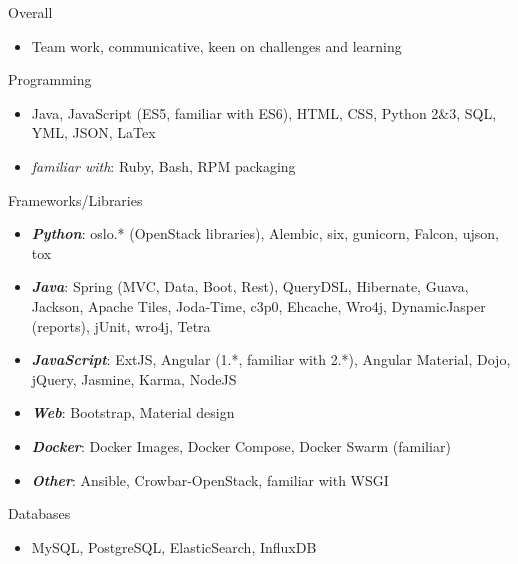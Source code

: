 
\begin{cvskills}

    \cvskill
    {Overall}
    {
      \begin{itemize}[label={}]
        \item Team work, communicative, keen on challenges and learning
      \end{itemize}
    }

    \cvskill
    {Programming}
    {
      \begin{itemize}[label={}]
        \item Java, JavaScript (ES5, familiar with ES6), HTML, CSS, Python 2\&3,
          SQL, YML, JSON, LaTex
        \item \textit{familiar with}: Ruby, Bash, RPM packaging
      \end{itemize}
    }

    \cvskill
    {Frameworks/Libraries}
    {
      \begin{itemize}[label={}]
        \item \textit{\textbf{Python}}: oslo.* (OpenStack libraries), Alembic, six,
          gunicorn, Falcon, ujson, tox
        \item \textit{\textbf{Java}}: Spring (MVC, Data, Boot, Rest), QueryDSL, Hibernate, Guava, \linebreak
          Jackson, Apache Tiles, Joda-Time, c3p0, Ehcache, Wro4j, \linebreak
          DynamicJasper (reports), jUnit, wro4j, Tetra
        \item \textit{\textbf{JavaScript}}: ExtJS, Angular (1.*, familiar with 2.*),
          Angular Material, Dojo, jQuery,\linebreak
          Jasmine, Karma, NodeJS
        \item \textit{\textbf{Web}}: Bootstrap, Material design
        \item \textit{\textbf{Docker}}: Docker Images, Docker Compose, Docker Swarm (familiar)
        \item \textit{\textbf{Other}}: Ansible, Crowbar-OpenStack, familiar with WSGI
      \end{itemize}
    }

    \cvskill
    {Databases}
    {
      \begin{itemize}[label={}]
        \item MySQL, PostgreSQL, ElasticSearch, InfluxDB
      \end{itemize}
    }


\end{cvskills}
